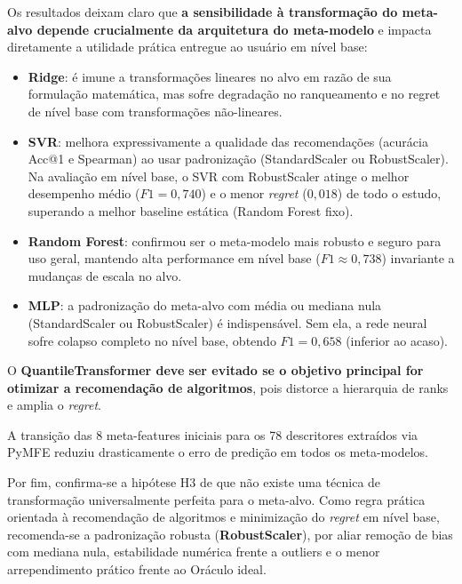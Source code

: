 \documentclass[12pt]{article}
\begin{document}
Os resultados deixam claro que \textbf{a sensibilidade à transformação do meta-alvo depende crucialmente da arquitetura do meta-modelo} e impacta diretamente a utilidade prática entregue ao usuário em nível base:

\begin{itemize}
  \item \textbf{Ridge}: é imune a transformações lineares no alvo em razão de sua formulação matemática, mas sofre degradação no ranqueamento e no regret de nível base com transformações não-lineares.
  \item \textbf{SVR}: melhora expressivamente a qualidade das recomendações (acurácia Acc@1 e Spearman) ao usar padronização (StandardScaler ou RobustScaler). Na avaliação em nível base, o SVR com RobustScaler atinge o melhor desempenho médio ($F1 = 0{,}740$) e o menor \textit{regret} ($0{,}018$) de todo o estudo, superando a melhor baseline estática (Random Forest fixo).
  \item \textbf{Random Forest}: confirmou ser o meta-modelo mais robusto e seguro para uso geral, mantendo alta performance em nível base ($F1 \approx 0{,}738$) invariante a mudanças de escala no alvo.
  \item \textbf{MLP}: a padronização do meta-alvo com média ou mediana nula (StandardScaler ou RobustScaler) é indispensável. Sem ela, a rede neural sofre colapso completo no nível base, obtendo $F1 = 0{,}658$ (inferior ao acaso).
\end{itemize}

O \textbf{QuantileTransformer deve ser evitado se o objetivo principal for otimizar a recomendação de algoritmos}, pois distorce a hierarquia de ranks e amplia o \textit{regret}.

A transição das 8 meta-features iniciais para os 78 descritores extraídos via PyMFE reduziu drasticamente o erro de predição em todos os meta-modelos.

Por fim, confirma-se a hipótese H3 de que não existe uma técnica de transformação universalmente perfeita para o meta-alvo. Como regra prática orientada à recomendação de algoritmos e minimização do \textit{regret} em nível base, recomenda-se a padronização robusta (\textbf{RobustScaler}), por aliar remoção de bias com mediana nula, estabilidade numérica frente a outliers e o menor arrependimento prático frente ao Oráculo ideal.



\end{document}
